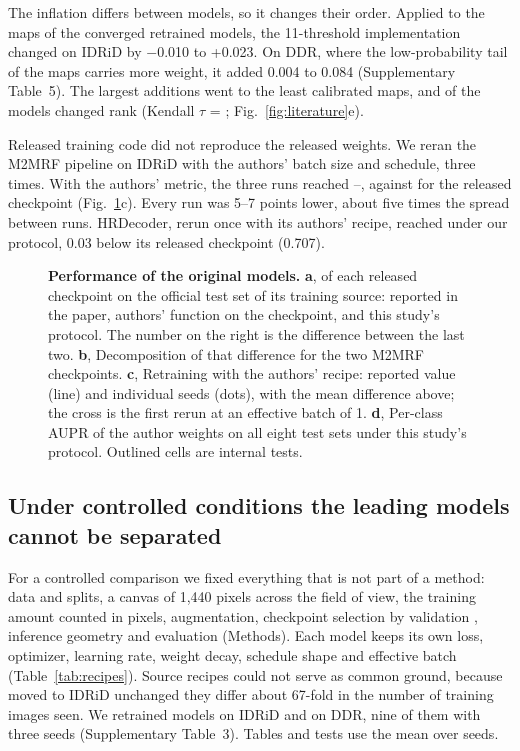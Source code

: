The inflation differs between models, so it changes their order. Applied to the maps of the converged retrained models, the 11-threshold implementation changed \mAUPR{} on IDRiD by $-$0.010 to +0.023. On DDR, where the low-probability tail of the maps carries more weight, it added 0.004 to 0.084 (Supplementary Table~5). The largest additions went to the least calibrated maps, and  of the  models changed rank (Kendall $\tau$ = ; Fig.~\ref{fig:literature}e).

Released training code did not reproduce the released weights. We reran the M2MRF pipeline on IDRiD with the authors' batch size and schedule, three times. With the authors' metric, the three runs reached --, against  for the released checkpoint (Fig.~\ref{fig:original}c). Every run was 5--7 points lower, about five times the spread between runs. HRDecoder, rerun once with its authors' recipe, reached  under our protocol, 0.03 below its released checkpoint (0.707).

\begin{figure}[t]
\centering
{}
\caption{\textbf{Performance of the original models.} \textbf{a}, \mAUPR{} of each released checkpoint on the official test set of its training source: reported in the paper, authors' function on the checkpoint, and this study's protocol. The number on the right is the difference between the last two. \textbf{b}, Decomposition of that difference for the two M2MRF checkpoints. \textbf{c}, Retraining with the authors' recipe: reported value (line) and individual seeds (dots), with the mean difference above; the cross is the first rerun at an effective batch of 1. \textbf{d}, Per-class AUPR of the author weights on all eight test sets under this study's protocol. Outlined cells are internal tests.}
\label{fig:original}
\end{figure}



\subsection{Under controlled conditions the leading models cannot be separated}
For a controlled comparison we fixed everything that is not part of a method: data and splits, a canvas of 1,440 pixels across the field of view, the training amount counted in pixels, augmentation, checkpoint selection by validation \mAUPR, inference geometry and evaluation (Methods). Each model keeps its own loss, optimizer, learning rate, weight decay, schedule shape and effective batch (Table~\ref{tab:recipes}). Source recipes could not serve as common ground, because moved to IDRiD unchanged they differ about 67-fold in the number of training images seen. We retrained  models on IDRiD and on DDR, nine of them with three seeds (Supplementary Table~3). Tables and tests use the mean over seeds.


